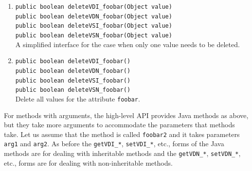 \begin{enumerate}
  {\tt public boolean deleteVSN\_foobar(Vector value)}
  \\
  Delete a set of values of the attribute {\tt foobar}. The set is
  specified in the vector argument.
\item {\tt public boolean deleteVDI\_foobar(Object value)}\\
  {\tt public boolean deleteVDN\_foobar(Object value)}
  \\
  {\tt public boolean deleteVSI\_foobar(Object value)}\\
  {\tt public boolean deleteVSN\_foobar(Object value)}
  \\
  A simplified interface for the case when only one value needs to be deleted.
\item {\tt public boolean deleteVDI\_foobar()}\\
  {\tt public boolean deleteVDN\_foobar()}
  \\
  {\tt public boolean deleteVSI\_foobar()}\\
  {\tt public boolean deleteVSN\_foobar()}
  \\
  Delete all values for the attribute {\tt foobar}. 
\end{enumerate}
For \fl methods with arguments, the high-level API provides Java methods as
above, but they take more arguments to accommodate the parameters that \fl
methods take. Let us
assume that the \fl method is called {\tt foobar2} and it takes parameters
{\tt arg1} and {\tt arg2}.  As before the {\tt getVDI\_*}, {\tt setVDI\_*},
etc., forms of the Java methods are for dealing with inheritable \FLSYSTEM
methods and the {\tt getVDN\_*}, {\tt setVDN\_*},
etc., forms are for dealing with non-inheritable \FLSYSTEM methods.

